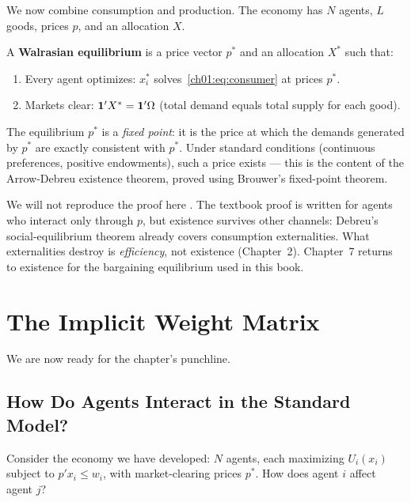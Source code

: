 \documentclass[../structural_economics_book.tex]{subfiles}
\begin{document}
We now combine consumption and production. The economy has $N$ agents, $L$ goods, prices $p$, and an allocation $X$.

\begin{definition}\label{ch01:def:walrasian}
A \textbf{Walrasian equilibrium} is a price vector $p^*$ and an allocation $X^*$ such that:
\begin{enumerate}
\item Every agent optimizes: $x_i^*$ solves~\eqref{ch01:eq:consumer} at prices $p^*$.
\item Markets clear: $\mathbf{1}'X^* = \mathbf{1}'\Omega$ (total demand equals total supply for each good).
\end{enumerate}
\end{definition}

The equilibrium $p^*$ is a \textit{fixed point}: it is the price at which the demands generated by $p^*$ are exactly consistent with $p^*$. Under standard conditions (continuous preferences, positive endowments), such a price exists --- this is the content of the Arrow-Debreu existence theorem, proved using Brouwer's fixed-point theorem.

We will not reproduce the proof here \citep[see][Chapter~17]{mascolell1995microeconomic}. The textbook proof is written for agents who interact only through $p$, but existence survives other channels: Debreu's \citeyearpar{debreu1952social} social-equilibrium theorem already covers consumption externalities. What externalities destroy is \textit{efficiency}, not existence (Chapter~2). Chapter~7 returns to existence for the bargaining equilibrium used in this book.


\section{The Implicit Weight Matrix}
\label{ch01:sec:implicit_W}

We are now ready for the chapter's punchline. 

\subsection{How Do Agents Interact in the Standard Model?}

Consider the economy we have developed: $N$ agents, each maximizing $U_i(x_i)$ subject to $p'x_i \leq w_i$, with market-clearing prices $p^*$. How does agent $i$ affect agent $j$?
\end{document}
